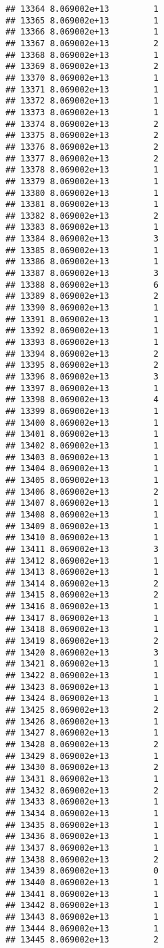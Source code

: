 \documentclass[
]{article}
\begin{document}
\begin{verbatim}
## 13364 8.069002e+13         1
## 13365 8.069002e+13         1
## 13366 8.069002e+13         1
## 13367 8.069002e+13         2
## 13368 8.069002e+13         1
## 13369 8.069002e+13         2
## 13370 8.069002e+13         1
## 13371 8.069002e+13         1
## 13372 8.069002e+13         1
## 13373 8.069002e+13         1
## 13374 8.069002e+13         2
## 13375 8.069002e+13         2
## 13376 8.069002e+13         2
## 13377 8.069002e+13         2
## 13378 8.069002e+13         1
## 13379 8.069002e+13         1
## 13380 8.069002e+13         1
## 13381 8.069002e+13         1
## 13382 8.069002e+13         2
## 13383 8.069002e+13         1
## 13384 8.069002e+13         3
## 13385 8.069002e+13         1
## 13386 8.069002e+13         1
## 13387 8.069002e+13         3
## 13388 8.069002e+13         6
## 13389 8.069002e+13         2
## 13390 8.069002e+13         1
## 13391 8.069002e+13         1
## 13392 8.069002e+13         1
## 13393 8.069002e+13         1
## 13394 8.069002e+13         2
## 13395 8.069002e+13         2
## 13396 8.069002e+13         3
## 13397 8.069002e+13         1
## 13398 8.069002e+13         4
## 13399 8.069002e+13         1
## 13400 8.069002e+13         1
## 13401 8.069002e+13         1
## 13402 8.069002e+13         1
## 13403 8.069002e+13         1
## 13404 8.069002e+13         1
## 13405 8.069002e+13         1
## 13406 8.069002e+13         2
## 13407 8.069002e+13         1
## 13408 8.069002e+13         1
## 13409 8.069002e+13         1
## 13410 8.069002e+13         1
## 13411 8.069002e+13         3
## 13412 8.069002e+13         1
## 13413 8.069002e+13         1
## 13414 8.069002e+13         2
## 13415 8.069002e+13         2
## 13416 8.069002e+13         1
## 13417 8.069002e+13         1
## 13418 8.069002e+13         1
## 13419 8.069002e+13         2
## 13420 8.069002e+13         3
## 13421 8.069002e+13         1
## 13422 8.069002e+13         1
## 13423 8.069002e+13         1
## 13424 8.069002e+13         1
## 13425 8.069002e+13         2
## 13426 8.069002e+13         1
## 13427 8.069002e+13         1
## 13428 8.069002e+13         2
## 13429 8.069002e+13         1
## 13430 8.069002e+13         2
## 13431 8.069002e+13         1
## 13432 8.069002e+13         2
## 13433 8.069002e+13         1
## 13434 8.069002e+13         1
## 13435 8.069002e+13         1
## 13436 8.069002e+13         1
## 13437 8.069002e+13         1
## 13438 8.069002e+13         2
## 13439 8.069002e+13         0
## 13440 8.069002e+13         1
## 13441 8.069002e+13         1
## 13442 8.069002e+13         1
## 13443 8.069002e+13         1
## 13444 8.069002e+13         1
## 13445 8.069002e+13         2

\end{verbatim}
\end{document}
